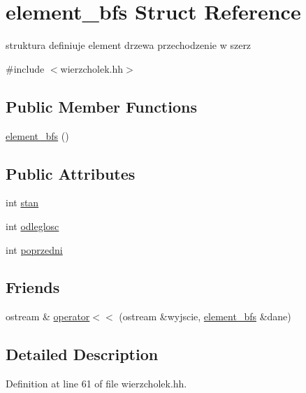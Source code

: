 \hypertarget{structelement__bfs}{\section{element\-\_\-bfs \-Struct \-Reference}
\label{structelement__bfs}
}


struktura definiuje element drzewa przechodzenie w szerz  




{\ttfamily \#include $<$wierzcholek.\-hh$>$}

\subsection*{\-Public \-Member \-Functions}
\begin{DoxyCompactItemize}
\item 
\hyperlink{structelement__bfs_a9c764ce268e74260e6634ea98ed13781}{element\-\_\-bfs} ()
\end{DoxyCompactItemize}
\subsection*{\-Public \-Attributes}
\begin{DoxyCompactItemize}
\item 
int \hyperlink{structelement__bfs_aa654df64808f513f41d0349571e4b90e}{stan}
\item 
int \hyperlink{structelement__bfs_a91fcdfed5d5dc2bce6ca9bb4414df196}{odleglosc}
\item 
int \hyperlink{structelement__bfs_a94b882f6922be485d6942f71c29e581d}{poprzedni}
\end{DoxyCompactItemize}
\subsection*{\-Friends}
\begin{DoxyCompactItemize}
\item 
ostream \& \hyperlink{structelement__bfs_a8b076b347dc8398fd7e704d74299eb3a}{operator$<$$<$} (ostream \&wyjscie, \hyperlink{structelement__bfs}{element\-\_\-bfs} \&dane)
\end{DoxyCompactItemize}


\subsection{\-Detailed \-Description}


\-Definition at line 61 of file wierzcholek.\-hh.



